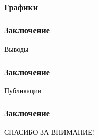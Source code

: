 \documentclass[compress,professionalfont]{beamer}
\begin{document}
\begin{frame}
\frametitle{Графики}

\end{frame}

\begin{frame}
\frametitle{Заключение}

\begin{center}
Выводы
\end{center}

\end{frame}

\begin{frame}
\frametitle{Заключение}

Публикации
\begin{center}

\end{center}

\end{frame}

\begin{frame}

\frametitle{Заключение}

\begin{center}
СПАСИБО ЗА ВНИМАНИЕ!
\end{center}

\end{frame}
\end{document}
